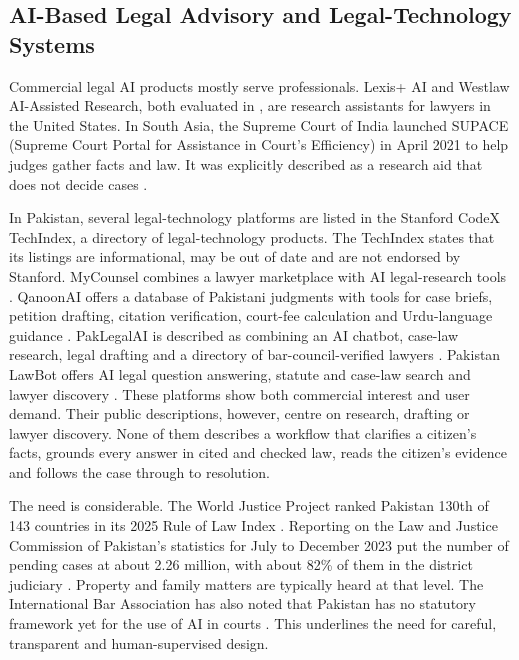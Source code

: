 \subsection{AI-Based Legal Advisory and Legal-Technology Systems}

Commercial legal AI products mostly serve professionals. Lexis+ AI and Westlaw AI-Assisted Research, both evaluated in \cite{r9}, are research assistants for lawyers in the United States. In South Asia, the Supreme Court of India launched SUPACE (Supreme Court Portal for Assistance in Court's Efficiency) in April 2021 to help judges gather facts and law. It was explicitly described as a research aid that does not decide cases \cite{r27}.

In Pakistan, several legal-technology platforms are listed in the Stanford CodeX TechIndex, a directory of legal-technology products. The TechIndex states that its listings are informational, may be out of date and are not endorsed by Stanford. MyCounsel combines a lawyer marketplace with AI legal-research tools \cite{r21}. QanoonAI offers a database of Pakistani judgments with tools for case briefs, petition drafting, citation verification, court-fee calculation and Urdu-language guidance \cite{r22}. PakLegalAI is described as combining an AI chatbot, case-law research, legal drafting and a directory of bar-council-verified lawyers \cite{r23}. Pakistan LawBot offers AI legal question answering, statute and case-law search and lawyer discovery \cite{r24}. These platforms show both commercial interest and user demand. Their public descriptions, however, centre on research, drafting or lawyer discovery. None of them describes a workflow that clarifies a citizen's facts, grounds every answer in cited and checked law, reads the citizen's evidence and follows the case through to resolution.

The need is considerable. The World Justice Project ranked Pakistan 130th of 143 countries in its 2025 Rule of Law Index \cite{r25}. Reporting on the Law and Justice Commission of Pakistan's statistics for July to December 2023 put the number of pending cases at about 2.26 million, with about 82\% of them in the district judiciary \cite{r26}. Property and family matters are typically heard at that level. The International Bar Association has also noted that Pakistan has no statutory framework yet for the use of AI in courts \cite{r28}. This underlines the need for careful, transparent and human-supervised design.

